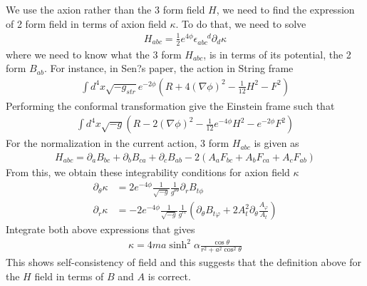 \documentclass[prd]{revtex4}
\begin{document}
We use the axion rather than the 3 form field $H$, we need to find the expression of 2 form field in terms of axion field $\kappa$. To do that, we need to solve
\begin{align}
H_{abc} = \frac{1}{2} e^{4 \phi} \epsilon_{abc}^{\; \; \; \; \; d} \partial_d \kappa
\end{align}
where we need to know what the 3 form $H_{abc}$, is in terms of its potential, the 2 form $B_{ab}$.  For instance, in Sen?s paper, the action in String frame
\begin{align}
\int d^4 x \sqrt{-g_{str}} e^{-2 \phi} \left(R+4 (\nabla \phi)^2 -\frac{1}{12} H^2 - F^2 \right)
\end{align}
Performing the conformal transformation give the Einstein frame such that
\begin{align}
\int d^4 x \sqrt{-g}\left(R - 2 (\nabla \phi)^2 -\frac{1}{12} e^{-4 \phi} H^2 - e^{-2\phi}F^2 \right)
\end{align}
For the normalization in the current action, 3 form $H_{abc}$ is given as
\begin{align}
H_{abc} = \partial_a B_{bc} + \partial_b B_{ca} + \partial_c B_{ab} - 2( A_a F_{bc} + A_b F_{ca} + A_c F_{ab} )
\end{align}
From this, we obtain these integrability conditions for axion field $\kappa$ 
\begin{align}
\partial_\theta \kappa &= 2 e^{-4 \phi} \frac{1}{\sqrt{-g}} \frac{1}{g^{\theta \theta}} \partial_r B_{t \phi} \\
\partial_r \kappa &= - 2 e^{-4 \phi} \frac{1}{\sqrt{-g}} \frac{1}{g^{rr}} \left( \partial_\theta B_{t \varphi} + 2 A_t^2 \partial_\theta \frac{A_\varphi}{A_t} \right)
\end{align}
Integrate both above expressions that gives
\begin{align}
\kappa = 4 m a \sinh^2 \alpha \frac{\cos \theta}{r^2 + a^2 \cos^2 \theta}
\end{align}
This shows self-consistency of field and this suggests that the definition above for the $H$ field in terms of $B$ and $A$ is correct.
\end{document}
